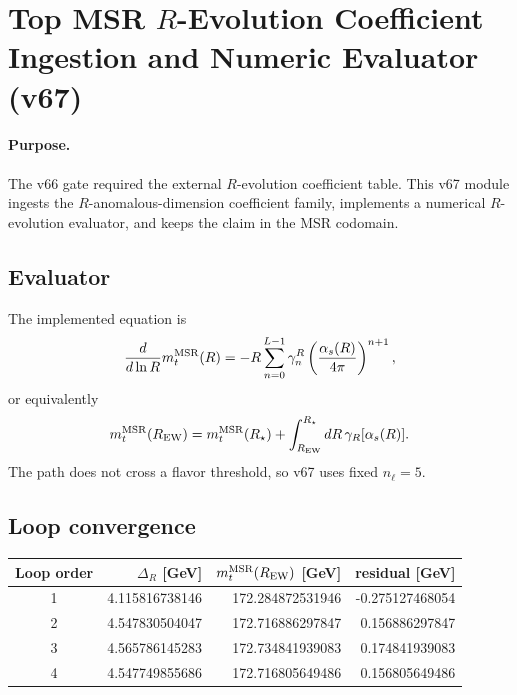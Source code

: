 
\section{Top MSR $R$-Evolution Coefficient Ingestion and Numeric Evaluator (v67)}
\label{sec:v67-top-msr-r-evolution-numeric}

\paragraph{Purpose.}
The v66 gate required the external $R$-evolution coefficient table.  This v67 module ingests the $R$-anomalous-dimension coefficient family, implements a numerical $R$-evolution evaluator, and keeps the claim in the MSR codomain.

\begin{center}
\end{center}

\subsection{Evaluator}
The implemented equation is
\[
  \frac{d}{d\ln R}m_t^{\rm MSR}(R)
  =-R\sum_{n=0}^{L-1}\gamma_n^R
  \left(\frac{\alpha_s(R)}{4\pi}\right)^{n+1},
\]
or equivalently
\[
  m_t^{\rm MSR}(R_{\rm EW})
  =m_t^{\rm MSR}(R_\star)+
  \int_{R_{\rm EW}}^{R_\star}
  dR\,\gamma_R[\alpha_s(R)].
\]
The path does not cross a flavor threshold, so v67 uses fixed $n_\ell=5$.

\subsection{Loop convergence}
\begin{center}
\begin{tabular}{c r r r}
\hline
Loop order & $\Delta_R$ [GeV] & $m_t^{\rm MSR}(R_{\rm EW})$ [GeV] & residual [GeV]\\
\hline
1 & 4.115816738146 & 172.284872531946 & -0.275127468054\\
2 & 4.547830504047 & 172.716886297847 & 0.156886297847\\
3 & 4.565786145283 & 172.734841939083 & 0.174841939083\\
4 & 4.547749855686 & 172.716805649486 & 0.156805649486\\
\hline
\end{tabular}
\end{center}

